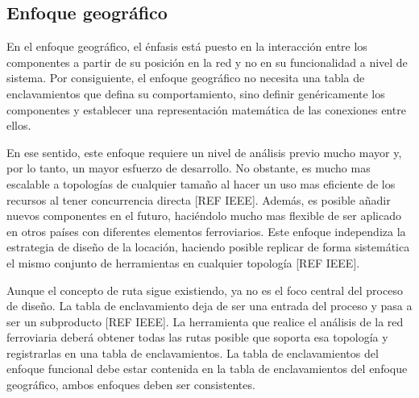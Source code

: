 \subsection{Enfoque geográfico}

    En el enfoque geográfico, el énfasis está puesto en la interacción entre los componentes a partir de su posición en la red y no en su funcionalidad a nivel de sistema. Por consiguiente, el enfoque geográfico no necesita una tabla de enclavamientos que defina su comportamiento, sino definir genéricamente los componentes y establecer una representación matemática de las conexiones entre ellos. 
    
    En ese sentido, este enfoque requiere un nivel de análisis previo mucho mayor y, por lo tanto, un mayor esfuerzo de desarrollo. No obstante, es mucho mas escalable a topologías de cualquier tamaño al hacer un uso mas eficiente de los recursos al tener concurrencia directa [REF IEEE]. Además, es posible añadir nuevos componentes en el futuro, haciéndolo mucho mas flexible de ser aplicado en otros países con diferentes elementos ferroviarios. Este enfoque independiza la estrategia de diseño de la locación, haciendo posible replicar de forma sistemática el mismo conjunto de herramientas en cualquier topología [REF IEEE].

    Aunque el concepto de ruta sigue existiendo, ya no es el foco central del proceso de diseño. La tabla de enclavamiento deja de ser una entrada del proceso y pasa a ser un subproducto [REF IEEE]. La herramienta que realice el análisis de la red ferroviaria deberá obtener todas las rutas posible que soporta esa topología y registrarlas en una tabla de enclavamientos. La tabla de enclavamientos del enfoque funcional debe estar contenida en la tabla de enclavamientos del enfoque geográfico, ambos enfoques deben ser consistentes.
